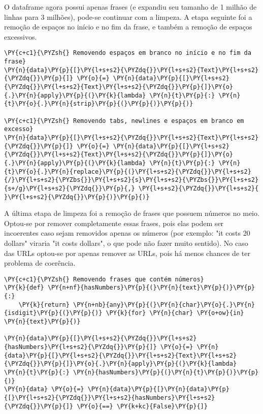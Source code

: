 \documentclass[a4paper,11pt,final]{article}
\begin{document}
O dataframe agora possui apenas frases (e expandiu seu tamanho de 1 milhão de linhas para 3 milhões), pode-se continuar com a limpeza.
A etapa seguinte foi a remoção de espaços no início e no fim da frase, e também a remoção de espaços excessivos.



\begin{Verbatim}[commandchars=\\\{\},frame=single,fontsize=\small, xleftmargin=0.5em]
\PY{c+c1}{\PYZsh{} Removendo espaços em branco no início e no fim da frase}
\PY{n}{data}\PY{p}{[}\PY{l+s+s2}{\PYZdq{}}\PY{l+s+s2}{Text}\PY{l+s+s2}{\PYZdq{}}\PY{p}{]} \PY{o}{=} \PY{n}{data}\PY{p}{[}\PY{l+s+s2}{\PYZdq{}}\PY{l+s+s2}{Text}\PY{l+s+s2}{\PYZdq{}}\PY{p}{]}\PY{o}{.}\PY{n}{apply}\PY{p}{(}\PY{k}{lambda} \PY{n}{t}\PY{p}{:} \PY{n}{t}\PY{o}{.}\PY{n}{strip}\PY{p}{(}\PY{p}{)}\PY{p}{)}

\PY{c+c1}{\PYZsh{} Removendo tabs, newlines e espaços em branco em excesso}
\PY{n}{data}\PY{p}{[}\PY{l+s+s2}{\PYZdq{}}\PY{l+s+s2}{Text}\PY{l+s+s2}{\PYZdq{}}\PY{p}{]} \PY{o}{=} \PY{n}{data}\PY{p}{[}\PY{l+s+s2}{\PYZdq{}}\PY{l+s+s2}{Text}\PY{l+s+s2}{\PYZdq{}}\PY{p}{]}\PY{o}{.}\PY{n}{apply}\PY{p}{(}\PY{k}{lambda} \PY{n}{t}\PY{p}{:} \PY{n}{t}\PY{o}{.}\PY{n}{replace}\PY{p}{(}\PY{l+s+s2}{\PYZdq{}}\PY{l+s+s2}{/}\PY{l+s+s2}{\PYZbs{}}\PY{l+s+s2}{s}\PY{l+s+s2}{\PYZbs{}}\PY{l+s+s2}{s+/g}\PY{l+s+s2}{\PYZdq{}}\PY{p}{,} \PY{l+s+s2}{\PYZdq{}}\PY{l+s+s2}{ }\PY{l+s+s2}{\PYZdq{}}\PY{p}{)}\PY{p}{)}
\end{Verbatim}


A última etapa de limpeza foi a remoção de frases que possuem números no meio.
Optou-se por remover completamente essas frases, pois elas podem ser incoerentes caso sejam removidos apenas os números (por exemplo: "it costs 20 dollars" viraria "it costs dollars", o que pode não fazer muito sentido).
No caso das URLs optou-se por apenas remover as URLs, pois há menos chances de ter problema de coerência.



\begin{Verbatim}[commandchars=\\\{\},frame=single,fontsize=\small, xleftmargin=0.5em]
\PY{c+c1}{\PYZsh{} Removendo frases que contém números}
\PY{k}{def} \PY{n+nf}{hasNumbers}\PY{p}{(}\PY{n}{text}\PY{p}{)}\PY{p}{:}
    \PY{k}{return} \PY{n+nb}{any}\PY{p}{(}\PY{n}{char}\PY{o}{.}\PY{n}{isdigit}\PY{p}{(}\PY{p}{)} \PY{k}{for} \PY{n}{char} \PY{o+ow}{in} \PY{n}{text}\PY{p}{)}

\PY{n}{data}\PY{p}{[}\PY{l+s+s2}{\PYZdq{}}\PY{l+s+s2}{hasNumbers}\PY{l+s+s2}{\PYZdq{}}\PY{p}{]} \PY{o}{=} \PY{n}{data}\PY{p}{[}\PY{l+s+s2}{\PYZdq{}}\PY{l+s+s2}{Text}\PY{l+s+s2}{\PYZdq{}}\PY{p}{]}\PY{o}{.}\PY{n}{apply}\PY{p}{(}\PY{k}{lambda} \PY{n}{t}\PY{p}{:} \PY{n}{hasNumbers}\PY{p}{(}\PY{n}{t}\PY{p}{)}\PY{p}{)}
\PY{n}{data} \PY{o}{=} \PY{n}{data}\PY{p}{[}\PY{n}{data}\PY{p}{[}\PY{l+s+s2}{\PYZdq{}}\PY{l+s+s2}{hasNumbers}\PY{l+s+s2}{\PYZdq{}}\PY{p}{]} \PY{o}{==} \PY{k+kc}{False}\PY{p}{]}
\end{Verbatim}
\end{document}
